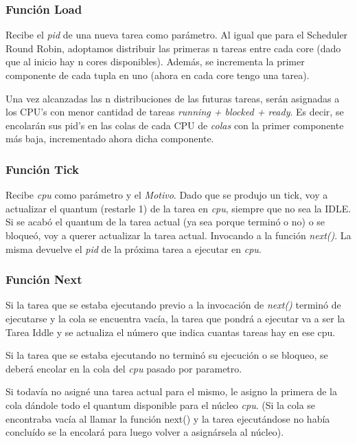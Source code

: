 \documentclass[a4paper]{article}
\begin{document}
\subsubsection*{Funci\'on Load}

Recibe el \emph{pid} de una nueva tarea como par\'ametro. Al igual que para el Scheduler Round Robin, adoptamos distribuir las primeras n tareas entre cada core (dado que al inicio hay n cores disponibles). Además, se incrementa la primer componente de cada tupla en uno (ahora en cada core tengo una tarea).

 Una vez alcanzadas las n distribuciones de las futuras tareas, ser\'an asignadas a los CPU's con menor cantidad de tareas \emph{running + blocked + ready}.  Es decir, se encolar\'an sus pid's en las colas de cada CPU de \emph{colas} con la primer componente más baja, incrementado ahora dicha componente.

\subsubsection*{Funci\'on Tick}	

Recibe \emph{cpu} como par\'ametro y el \emph{Motivo}. Dado que se produjo un tick, voy a actualizar el quantum (restarle 1) de la tarea en \emph{cpu}, siempre que no sea la IDLE. Si se acab\'o el quantum de la tarea actual (ya sea porque termin\'o o no) o se bloque\'o, voy a querer actualizar la tarea actual. Invocando a la funci\'on \emph{next()}. La misma devuelve el \emph{pid} de la próxima tarea a ejecutar en \emph{cpu}.

\subsubsection*{Funci\'on Next}	
	

Si la tarea que se estaba ejecutando previo a la invocaci\'on de \emph{next()} termin\'o de ejecutarse y la cola se encuentra vac\'ia, la tarea que pondr\'a a ejecutar va a ser la Tarea Iddle y se actualiza el número que indica cuantas tareas hay en ese cpu.

Si la tarea que se estaba ejecutando no termin\'o su ejecuci\'on o se bloqueo, se deber\'a encolar en la cola del \emph{cpu} pasado por parametro.

Si todav\'ia no asign\'e una tarea actual para el mismo, le asigno la primera de la cola d\'andole todo el quantum disponible para el n\'ucleo \emph{cpu}. (Si la cola se encontraba vac\'ia al llamar la funci\'on next() y la tarea ejecut\'andose no hab\'ia conclu\'ido se la encolar\'a para luego volver a asign\'arsela al n\'ucleo).\\
 
\end{document}
